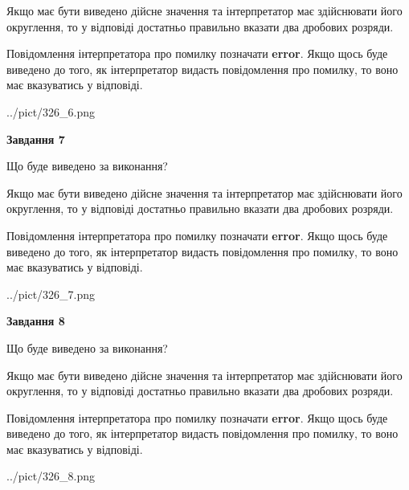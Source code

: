 \documentclass[12pt, ukrainian]{article}
\begin{document}
{\begin {Large}
Якщо має бути виведено дійсне значення та інтерпретатор має здійснювати його округлення, 
то у відповіді достатньо правильно вказати два дробових розряди.

Повідомлення інтерпретатора про помилку позначати \textbf{error}.
Якщо щось буде виведено до того, як інтерпретатор видасть повідомлення про помилку, 
то воно має вказуватись у відповіді. \par

\begin{center}
	{../pict/326_6.png}
\end{center}
\newpage

{\begin {center}\textbf{Завдання 7}\end {center}}\par
Що буде виведено за виконання? \par

Якщо має бути виведено дійсне значення та інтерпретатор має здійснювати його округлення, 
то у відповіді достатньо правильно вказати два дробових розряди.

Повідомлення інтерпретатора про помилку позначати \textbf{error}.
Якщо щось буде виведено до того, як інтерпретатор видасть повідомлення про помилку, 
то воно має вказуватись у відповіді. \par

\begin{center}
	{../pict/326_7.png}
\end{center}
\newpage

{\begin {center}\textbf{Завдання 8}\end {center}}\par
Що буде виведено за виконання? \par

Якщо має бути виведено дійсне значення та інтерпретатор має здійснювати його округлення, 
то у відповіді достатньо правильно вказати два дробових розряди.

Повідомлення інтерпретатора про помилку позначати \textbf{error}.
Якщо щось буде виведено до того, як інтерпретатор видасть повідомлення про помилку, 
то воно має вказуватись у відповіді. \par

\begin{center}
	{../pict/326_8.png}
\end{center}
\newpage


\end{Large}}
\end{document}
